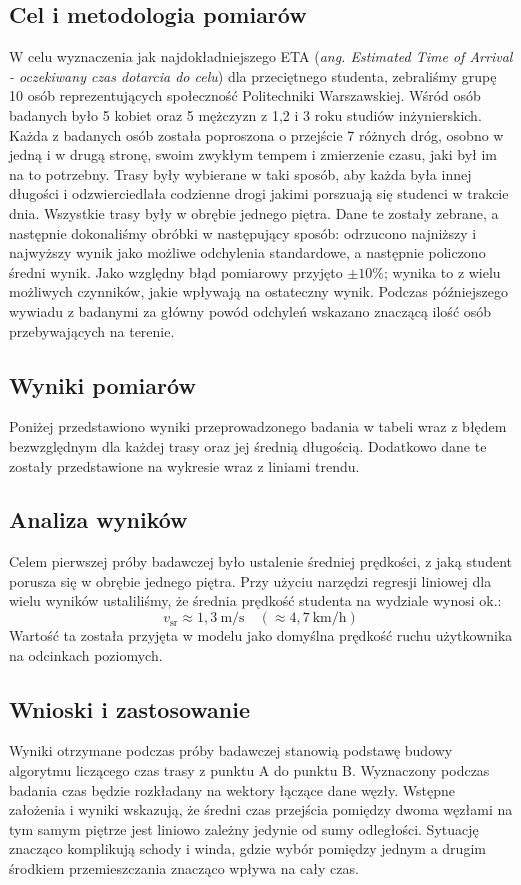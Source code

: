 \documentclass[14pt,a4paper]{extarticle}
\begin{document}
\subsection{Cel i metodologia pomiarów}
W celu wyznaczenia jak najdokładniejszego ETA (\textit{ang. Estimated Time of Arrival - oczekiwany czas dotarcia do celu}) dla przeciętnego studenta, zebraliśmy grupę 10 osób reprezentujących społeczność Politechniki Warszawskiej. Wśród osób badanych było 5 kobiet oraz 5 mężczyzn z 1,2 i 3 roku studiów inżynierskich. Każda z badanych osób została poproszona o przejście 7 różnych dróg, osobno w jedną i w drugą stronę, swoim zwykłym tempem i zmierzenie czasu, jaki był im na to potrzebny. Trasy były wybierane w taki sposób, aby każda była innej długości i odzwierciedlała codzienne drogi jakimi porszuają się studenci w trakcie dnia. Wszystkie trasy były w obrębie jednego piętra. Dane te zostały zebrane, a następnie dokonaliśmy obróbki w następujący sposób: odrzucono najniższy i najwyższy wynik jako możliwe odchylenia standardowe, a następnie policzono średni wynik. Jako względny błąd pomiarowy przyjęto $\pm 10\%$; wynika to z wielu możliwych czynników, jakie wpływają na ostateczny wynik. Podczas późniejszego wywiadu z badanymi za główny powód odchyleń wskazano znaczącą ilość osób przebywających na terenie.

\subsection{Wyniki pomiarów}
Poniżej przedstawiono wyniki przeprowadzonego badania w tabeli wraz z błędem bezwzględnym dla każdej trasy oraz jej średnią długością.  Dodatkowo dane te zostały przedstawione na wykresie wraz z liniami trendu.

\subsection{Analiza wyników}
Celem pierwszej próby badawczej było ustalenie średniej prędkości, z jaką student porusza się w obrębie jednego piętra. Przy użyciu narzędzi regresji liniowej dla wielu wyników ustaliliśmy, że średnia prędkość studenta na wydziale wynosi ok.:
\begin{equation}
    v_{\text{sr}} \approx 1{,}3\ \text{m/s} \quad (\approx 4{,}7\ \text{km/h})
\end{equation}
Wartość ta została przyjęta w modelu jako domyślna prędkość ruchu użytkownika na odcinkach poziomych.

\subsection{Wnioski i zastosowanie}
Wyniki otrzymane podczas próby badawczej stanowią podstawę budowy algorytmu liczącego czas trasy z punktu A do punktu B. Wyznaczony podczas badania czas będzie rozkładany na wektory łączące dane węzły. Wstępne założenia i wyniki wskazują, że średni czas przejścia pomiędzy dwoma węzłami na tym samym piętrze jest liniowo zależny jedynie od sumy odległości. Sytuację znacząco komplikują schody i winda, gdzie wybór pomiędzy jednym a drugim środkiem przemieszczania znacząco wpływa na cały czas.
\end{document}
